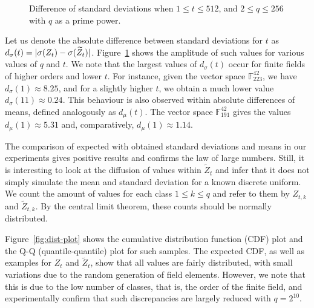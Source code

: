\documentclass[12pt, a4paper, oneside]{memoir}
\DeclarePairedDelimiter\abs{\lvert}{\rvert}
\theoremstyle{definition}
\begin{document}
\begin{figure}[htbp]
  \subfloat[
    $d_{\sigma}(t)$ for $n = 42, v_{1} = 17$.\label{fig:std-diff-n42}
  ]{
  }
  \subfloat[
    $d_{\sigma}(t)$ for $n = 90, v_{1} = 35$.\label{fig:std-diff-n90}
  ]{
  }
  \caption{Difference of standard deviations when $1 \leq t \leq 512$,
    and $2 \leq q \leq 256$ with $q$ as a prime power.}\label{fig:std-diff}
\end{figure}

Let us denote the absolute difference between standard deviations for $t$ as $d_{\sigma}(t) = \abs{\sigma(Z_{t}) - \sigma(\widetilde{Z}_{t})}$. Figure~\ref{fig:std-diff} shows the amplitude of such values for various values of $q$ and $t$. We note that the largest values of $d_{\sigma}(t)$ occur for finite fields of higher orders and lower $t$. For instance, given the vector space $\mathbb{F}_{223}^{42}$, we have $d_{\sigma}(1) \approx 8.25$, and for a slightly higher $t$, we obtain a much lower value $d_{\sigma}(11) \approx 0.24$. This behaviour is also observed within absolute differences of means, defined analogously as $d_{\mu}(t)$. The vector space $\mathbb{F}_{191}^{42}$ gives the values $d_{\mu}(1) \approx 5.31$ and, comparatively, $d_{\mu}(1) \approx 1.14$.

The comparison of expected with obtained standard deviations and means in our experiments gives positive results and confirms the law of large numbers. Still, it is interesting to look at the diffusion of values within $\widetilde{Z}_{t}$ and infer that it does not simply simulate the mean and standard deviation for a known discrete uniform. We count the amount of values for each class $1 \leq k \leq q$ and refer to them by $Z_{t, k}$ and $\widetilde{Z}_{t, k}$. By the central limit theorem, these counts should be normally distributed.

Figure~\ref{fig:dist-plot} shows the cumulative distribution function (CDF) plot and the Q-Q (quantile-quantile) plot for such samples. The expected CDF, as well as examples for $Z_{t}$ and $\widetilde{Z}_{t}$, show that all values are fairly distributed, with small variations due to the random generation of field elements. However, we note that this is due to the low number of classes, that is, the order of the finite field, and experimentally confirm that such discrepancies are largely reduced with $q = 2^{10}$.  
\end{document}
